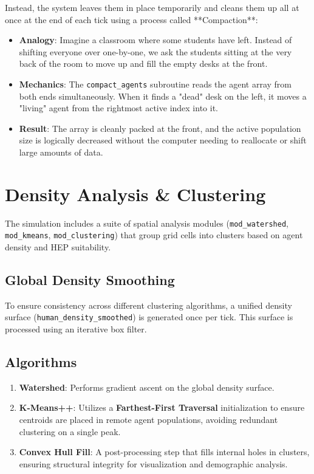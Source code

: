 Instead, the system leaves them in place temporarily and cleans them up all at once at the end of each tick using a process called **Compaction**:
\begin{itemize}
    \item \textbf{Analogy}: Imagine a classroom where some students have left. Instead of shifting everyone over one-by-one, we ask the students sitting at the very back of the room to move up and fill the empty desks at the front.
    \item \textbf{Mechanics}: The \texttt{compact\_agents} subroutine reads the agent array from both ends simultaneously. When it finds a "dead" desk on the left, it moves a "living" agent from the rightmost active index into it.
    \item \textbf{Result}: The array is cleanly packed at the front, and the active population size is logically decreased without the computer needing to reallocate or shift large amounts of data.
\end{itemize}


\section{Density Analysis \& Clustering}
The simulation includes a suite of spatial analysis modules (\texttt{mod\_watershed}, \texttt{mod\_kmeans}, \texttt{mod\_clustering}) that group grid cells into clusters based on agent density and HEP suitability.

\subsection{Global Density Smoothing}
To ensure consistency across different clustering algorithms, a unified density surface (\texttt{human\_density\_smoothed}) is generated once per tick. This surface is processed using an iterative box filter.

\subsection{Algorithms}
\begin{enumerate}
    \item \textbf{Watershed}: Performs gradient ascent on the global density surface.
    \item \textbf{K-Means++}: Utilizes a \textbf{Farthest-First Traversal} initialization to ensure centroids are placed in remote agent populations, avoiding redundant clustering on a single peak.
    \item \textbf{Convex Hull Fill}: A post-processing step that fills internal holes in clusters, ensuring structural integrity for visualization and demographic analysis.
\end{enumerate}

